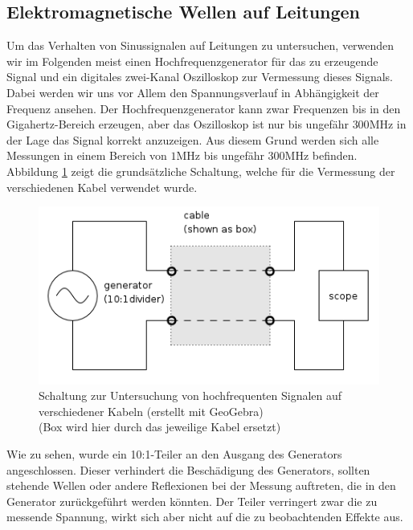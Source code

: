 \subsection{Elektromagnetische Wellen auf Leitungen} %
\label{sub:elektromagnetische_wellen_auf_leitungen}

	Um das Verhalten von Sinussignalen auf Leitungen zu untersuchen, 
	verwenden wir im Folgenden meist einen Hochfrequenzgenerator für das zu erzeugende Signal und ein digitales zwei-Kanal Oszilloskop zur Vermessung dieses Signals.
	Dabei werden wir uns vor Allem den Spannungsverlauf in Abhängigkeit der Frequenz ansehen.
	Der Hochfrequenzgenerator kann zwar Frequenzen bis in den Gigahertz-Bereich erzeugen, aber das Oszilloskop ist nur bis ungefähr $300$MHz in der Lage das Signal korrekt anzuzeigen.
	Aus diesem Grund werden sich alle Messungen in einem Bereich von $1$MHz bis ungefähr $300$MHz befinden.
	Abbildung \ref{schaltung-leitungen} zeigt die grundsätzliche Schaltung, welche für die Vermessung der verschiedenen Kabel verwendet wurde. \cite{unterlagen} 

	\begin{figure}[H]
		\centering
		\includegraphics[scale = 0.65]{schaltung-leitung-01.png}
		\caption{\centering  Schaltung zur Untersuchung von hochfrequenten Signalen auf verschiedener Kabeln (erstellt mit GeoGebra)\\ (Box wird hier durch das jeweilige Kabel ersetzt)}
		\label{schaltung-leitungen}
	\end{figure}

	Wie zu sehen, wurde ein 10:1-Teiler an den Ausgang des Generators angeschlossen.
	Dieser verhindert die Beschädigung des Generators, sollten stehende Wellen oder andere Reflexionen bei der Messung auftreten, die in den Generator zurückgeführt werden könnten.
	Der Teiler verringert zwar die zu messende Spannung, wirkt sich aber nicht auf die zu beobachtenden Effekte aus. \\


